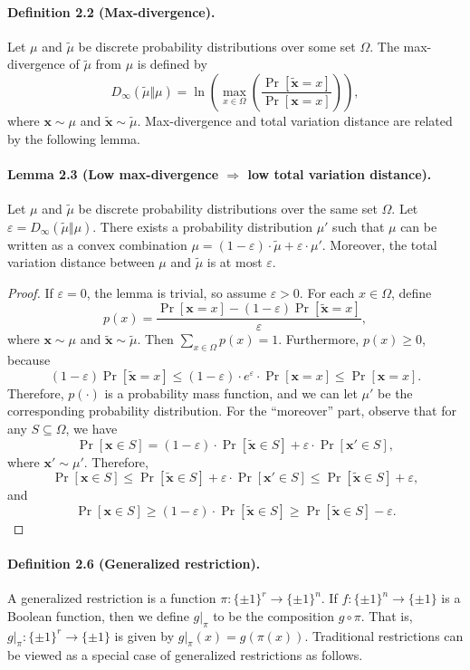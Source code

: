 \paragraph{Definition 2.2 (Max-divergence).} Let $\mu$ and $\widetilde\mu$ be discrete probability distributions over some set $\Omega$. The max-divergence of $\widetilde\mu$ from $\mu$ is defined by
\[D_\infty(\widetilde\mu\Vert\mu)=\ln\left(\max_{x\in\Omega}\left(\frac{\Pr[\widetilde{\mathbf x}=x]}{\Pr[\mathbf x=x]}\right)\right),\]
where $\mathbf x\sim\mu$ and $\widetilde{\mathbf x}\sim\widetilde\mu$.
Max-divergence and total variation distance are related by the following lemma.
\paragraph{Lemma 2.3 (Low max-divergence $\Rightarrow$ low total variation distance).} Let $\mu$ and $\widetilde\mu$ be discrete probability distributions over the same set $\Omega$. Let $\varepsilon=D_\infty(\widetilde\mu\Vert\mu)$. There exists a probability distribution $\mu'$ such that $\mu$ can be written as a convex combination $\mu=(1-\varepsilon)\cdot\widetilde\mu+\varepsilon\cdot\mu'$. Moreover, the total variation distance between $\mu$ and $\widetilde\mu$ is at most $\varepsilon$.
\begin{proof}
If $\varepsilon=0$, the lemma is trivial, so assume $\varepsilon>0$. For each $x\in\Omega$, define
\[p(x)=\frac{\Pr[\mathbf x=x]-(1-\varepsilon)\Pr[\widetilde{\mathbf x}=x]}{\varepsilon},\]
where $\mathbf x\sim\mu$ and $\widetilde{\mathbf x}\sim\widetilde\mu$. Then $\sum_{x\in\Omega}p(x)=1$. Furthermore, $p(x)\ge0$, because
\[(1-\varepsilon)\Pr[\widetilde{\mathbf x}=x]\le(1-\varepsilon)\cdot e^\varepsilon\cdot\Pr[\mathbf x=x]\le\Pr[\mathbf x=x].\]
Therefore, $p(\cdot)$ is a probability mass function, and we can let $\mu'$ be the corresponding probability distribution. For the ``moreover'' part, observe that for any $S\subseteq\Omega$, we have
\[\Pr[\mathbf x\in S]=(1-\varepsilon)\cdot\Pr[\widetilde{\mathbf x}\in S]+\varepsilon\cdot\Pr[\mathbf x'\in S],\]
where $\mathbf x'\sim\mu'$. Therefore,
\[\Pr[\mathbf x\in S]\le\Pr[\widetilde{\mathbf x}\in S]+\varepsilon\cdot\Pr[\mathbf x'\in S]\le\Pr[\widetilde{\mathbf x}\in S]+\varepsilon,\]
and
\[\Pr[\mathbf x\in S]\ge(1-\varepsilon)\cdot\Pr[\widetilde{\mathbf x}\in S]\ge\Pr[\widetilde{\mathbf x}\in S]-\varepsilon.\]
\end{proof}
\paragraph{Definition 2.6 (Generalized restriction).} A generalized restriction is a function $\pi:\{\pm1\}^r\to\{\pm1\}^n$. If $f:\{\pm1\}^n\to\{\pm1\}$ is a Boolean function, then we define $g|_\pi$ to be the composition $g\circ\pi$. That is, $g|_\pi:\{\pm1\}^r\to\{\pm1\}$ is given by $g|_\pi(x)=g(\pi(x))$.
Traditional restrictions can be viewed as a special case of generalized restrictions as follows.
